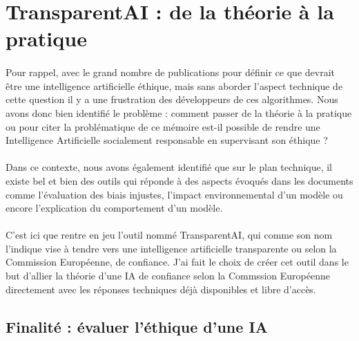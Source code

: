 \documentclass[10pt, french, a4paper]{report}
\begin{document}
\section{TransparentAI : de la théorie à la pratique}

\paragraph{}
Pour rappel, avec le grand nombre de publications pour définir ce que devrait être une intelligence artificielle éthique, mais sans aborder l'aspect technique de cette question il y a une frustration des développeurs de ces algorithmes. Nous avons donc bien identifié le problème : comment passer de la théorie à la pratique ou pour citer la problématique de ce mémoire est-il possible de rendre une Intelligence Artificielle socialement responsable en supervisant son éthique ?

\paragraph{}
Dans ce contexte, nous avons également identifié que sur le plan technique, il existe bel et bien des outils qui réponde à des aspects évoqués dans les documents comme l'évaluation des biais injustes, l'impact environnemental d'un modèle ou encore l'explication du comportement d'un modèle.

\paragraph{}
C'est ici que rentre en jeu l'outil nommé TransparentAI, qui comme son nom l'indique vise à tendre vers une intelligence artificielle transparente ou selon la Commission Européenne, de confiance. J'ai fait le choix de créer cet outil dans le but d'allier la théorie d'une IA de confiance selon la Commssion Européenne directement avec les réponses techniques déjà disponibles et libre d'accès. 

\subsection{Finalité : évaluer l'éthique d'une IA}
\end{document}
